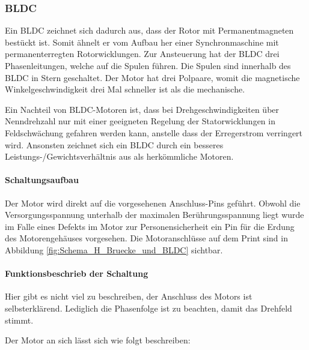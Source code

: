 \newpage
\subsubsection{BLDC}
\label{subsubsec:BLDC}

Ein BLDC zeichnet sich dadurch aus, dass der Rotor mit Permanentmagneten bestückt ist. Somit ähnelt er vom Aufbau her einer Synchronmaschine mit permanenterregten Rotorwicklungen. Zur Ansteuerung hat der BLDC drei Phasenleitungen, welche auf die Spulen führen. Die Spulen sind innerhalb des BLDC in Stern geschaltet. Der Motor hat drei Polpaare, womit die magnetische Winkelgeschwindigkeit drei Mal schneller ist als die mechanische.

Ein Nachteil von BLDC-Motoren ist, dass bei Drehgeschwindigkeiten über Nenndrehzahl nur mit einer geeigneten Regelung der Statorwicklungen in Feldschwächung gefahren werden kann, anstelle dass der Erregerstrom verringert wird. Ansonsten zeichnet sich ein BLDC durch ein besseres Leistungs-/Gewichtsverhältnis aus als herkömmliche Motoren.

\paragraph{Schaltungsaufbau}\mbox{}

Der Motor wird direkt auf die vorgesehenen Anschluss-Pins geführt. Obwohl die Versorgungsspannung unterhalb der maximalen Berührungsspannung liegt wurde im Falle eines Defekts im Motor zur Personensicherheit ein Pin für die Erdung des Motorengehäuses vorgesehen.
Die Motoranschlüsse auf dem Print sind in Abbildung \ref{fig:Schema_H_Bruecke_und_BLDC} sichtbar.

\paragraph{Funktionsbeschrieb der Schaltung}\mbox{}

Hier gibt es nicht viel zu beschreiben, der Anschluss des Motors ist selbsterklärend. Lediglich die Phasenfolge ist zu beachten, damit das Drehfeld stimmt.

Der Motor an sich lässt sich wie folgt beschreiben:

